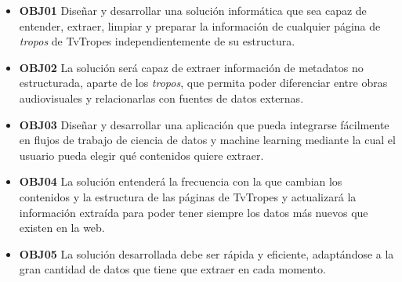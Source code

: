 \begin{itemize}
    \item \textbf{OBJ01} Diseñar y desarrollar una solución informática que sea
    capaz de entender, extraer, limpiar y preparar la información de cualquier
    página de \textit{tropos} de TvTropes independientemente de su estructura.
    \item \textbf{OBJ02} La solución será capaz de extraer información de
    metadatos no estructurada, aparte de los \textit{tropos}, que permita poder
    diferenciar entre obras audiovisuales y relacionarlas con fuentes de datos
    externas.
    \item \textbf{OBJ03} Diseñar y desarrollar una aplicación que pueda
    integrarse fácilmente en flujos de trabajo de ciencia de datos y machine
    learning mediante la cual el usuario pueda elegir qué contenidos quiere
    extraer.
    \item \textbf{OBJ04} La solución entenderá la frecuencia con la que cambian
    los contenidos y la estructura de las páginas de TvTropes y actualizará la
    información extraída para poder tener siempre los datos más nuevos que
    existen en la web.
    \item \textbf{OBJ05} La solución desarrollada debe ser rápida y eficiente,
    adaptándose a la gran cantidad de datos que tiene que extraer en cada
    momento.
\end{itemize}

